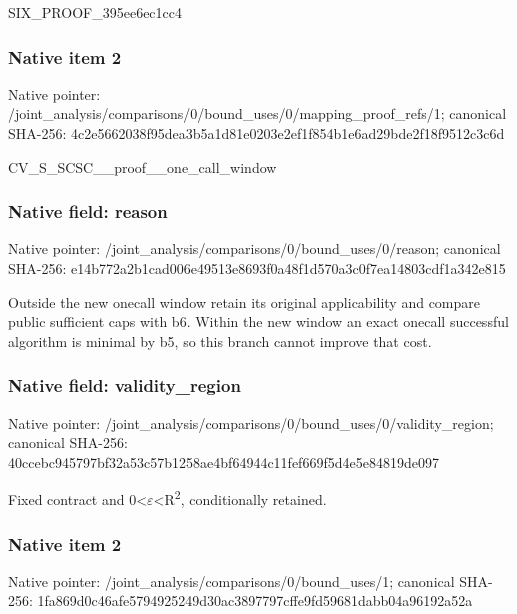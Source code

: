 \documentclass[10pt,a4paper]{article}
\begin{document}
SIX\_PROOF\_395ee6ec1cc4


\subsubsection{Native item 2}


Native pointer: /joint\_analysis/comparis\allowbreak{}ons/0/bound\_uses/0/mappi\allowbreak{}ng\_proof\_refs/1; canonical SHA-256: 4c2e5662038f95dea3b5a1d8\allowbreak{}1e0203e2ef1f854b1e6ad29b\allowbreak{}de2f18f9512c3c6d


CV\_S\_SCSC\_\_proof\_\_one\_call\_window


\subsubsection{Native field: reason}


Native pointer: /joint\_analysis/comparis\allowbreak{}ons/0/bound\_uses/0/reaso\allowbreak{}n; canonical SHA-256: e14b772a2b1cad006e49513e\allowbreak{}8693f0a48f1d570a3c0f7ea1\allowbreak{}4803cdf1a342e815


Outside the new onecall window retain its original applicability and compare public sufficient caps with b6. Within the new window an exact onecall successful algorithm is minimal by b5, so this branch cannot improve that cost.


\subsubsection{Native field: validity\_region}


Native pointer: /joint\_analysis/comparis\allowbreak{}ons/0/bound\_uses/0/valid\allowbreak{}ity\_region; canonical SHA-256: 40ccebc945797bf32a53c57b\allowbreak{}1258ae4bf64944c11fef669f\allowbreak{}5d4e5e84819de097


Fixed contract and 0<\ensuremath{\varepsilon}<R\textsuperscript{2}, conditionally retained.


\subsubsection{Native item 2}


Native pointer: /joint\_analysis/comparis\allowbreak{}ons/0/bound\_uses/1; canonical SHA-256: 1fa869d0c46afe5794925249\allowbreak{}d30ac3897797cffe9fd59681\allowbreak{}dabb04a96192a52a
\end{document}
